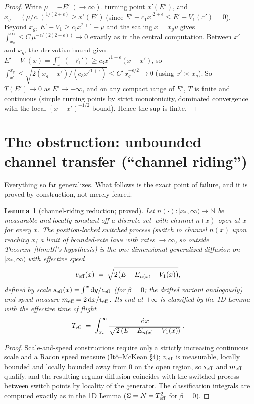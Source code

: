 \documentclass[11pt]{article}
\newtheorem{lemma}[theorem]{Lemma}
\theoremstyle{remark}
\newcommand{\dd}{\mathrm{d}}
\newcommand{\N}{\mathbb{N}}
\begin{document}
\begin{proof}
Write $\mu=-E'\ (\to\infty)$, turning point $x'(E')$, and
$x_{g}=(\mu/c_{1})^{1/(2+\epsilon)}\ge x'(E')$ (since
$E'+c_{1}x'^{2+\epsilon}\le E'-V_{1}(x')=0$).  Beyond $x_{g}$,
$E'-V_{1}\ge c_{1}x^{2+\epsilon}-\mu$ and the scaling
$x=x_{g}u$ gives
$\int_{x_{g}}^{\infty}\le C\,\mu^{-\epsilon/(2(2+\epsilon))}\to0$
exactly as in the central computation.  Between $x'$ and $x_{g}$, the
derivative bound gives
$E'-V_{1}(x)=\int_{x'}^{x}(-V_{1}')\ge c_{3}x'^{1+\epsilon}(x-x')$,
so
$\int_{x'}^{x_{g}}\le
\sqrt{2(x_{g}-x')/(c_{3}x'^{1+\epsilon})}
\le C'\,x_{g}^{-\epsilon/2}\to0$
(using $x'\asymp x_{g}$).  So $T(E')\to0$ as $E'\to-\infty$, and on any
compact range of $E'$, $T$ is finite and continuous (simple turning
points by strict monotonicity, dominated convergence with the local
$(x-x')^{-1/2}$ bound).  Hence the sup is finite.
\end{proof}

\section{The obstruction: unbounded channel transfer
(``channel riding'')}
\label{sec:obstruction}

Everything so far generalizes.  What follows is the exact point of
failure, and it is proved by construction, not merely feared.

\begin{lemma}[channel-riding reduction; proved]\label{lem:riding}
Let $n(\cdot):\bigl[x_{*},\infty\bigr)\to\N$ be measurable and locally
constant off a discrete set, with channel $n(x)$ open at $x$ for every
$x$.  The \emph{position-locked} switched process (switch to channel
$n(x)$ upon reaching $x$; a limit of bounded-rate laws with rates
$\to\infty$, so \emph{outside} Theorem~\ref{thm:B}'s hypothesis) is the
one-dimensional generalized diffusion on $[x_{*},\infty)$ with
effective speed
\[
v_{\rm eff}(x)\;=\;\sqrt{2\bigl(E-E_{n(x)}-V_{1}(x)\bigr)},
\]
defined by scale $s_{\rm eff}(x)=\int^{x}\dd y/v_{\rm eff}$ (for
$\beta=0$; the drifted variant analogously) and speed measure
$m_{\rm eff}=2\,\dd x/v_{\rm eff}$.  Its end at $+\infty$ is classified
by the 1D Lemma with the \emph{effective time of flight}
\[
T_{\rm eff}\;=\;\int_{x_{*}}^{\infty}
\frac{\dd x}{\sqrt{2\,(E-E_{n(x)}-V_{1}(x))}}\,.
\]
\end{lemma}

\begin{proof}
Scale-and-speed constructions require only a strictly increasing
continuous scale and a Radon speed measure (It\^o--McKean \S4);
$v_{\rm eff}$ is measurable, locally bounded and locally bounded away
from $0$ on the open region, so $s_{\rm eff}$ and $m_{\rm eff}$
qualify, and the resulting regular diffusion coincides with the
switched process between switch points by locality of the generator.
The classification integrals are computed exactly as in the 1D Lemma
($\Sigma=N=T_{\rm eff}^{2}$ for $\beta=0$).
\end{proof}
\end{document}
